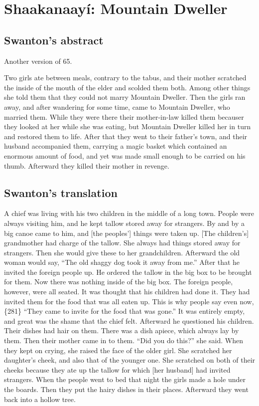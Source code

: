 
\resetexcnt
\chapter{Shaakanaayí: Mountain Dweller}\label{ch:92-mountain-dweller}

\section{Swanton’s abstract}\label{sec:92-swanton-abstract}

Another version of 65.

Two girls ate between meals, contrary to the tabus, and their mother scratched the inside of the mouth of the elder and scolded them both.
Among other things she told them that they could not marry Mountain Dweller.
Then the girls ran away, and after wandering for some time, came to Mountain Dweller, who married them.
While they were there their mother-in-law killed them becauser they looked at her while she was eating, but Mountain Dweller killed her in turn and restored them to life.
After that they went to their father’s town, and their husband accompanied them, carrying a magic basket which contained an enormous amount of food, and yet was made small enough to be carried on his thumb.
Afterward they killed their mother in revenge.

\section{Swanton’s translation}\label{sec:92-swanton-translation}

A chief was living with his two children in the middle of a long town.
People were always visiting him, and he kept tallow stored away for strangers.
By and by a big canoe came to him, and [the peoples’] things were taken up.
{}[The children’s] grandmother had charge of the tallow.
She always had things stored away for strangers.
Then she would give these to her grandchildren.
Afterward the old woman would say,
“The old shaggy dog took it away from me.”
After that he invited the foreign people up.
He ordered the tallow in the big box to be brought for them.
Now there was nothing inside of the big box.
The foreign people, however, were all seated.
It was thought that his children had done it.
They had invited them for the food that was all eaten up.
This is why people say even now,
\{281\} “They came to invite for the food that was gone.”
It was entirely empty, and great was the shame that the chief felt.
Afterward he questioned his children.
Their dishes had hair on them.
There was a dish apiece, which always lay by them.
Then their mother came in to them.
“Did you do this?”
she said.
When they kept on crying, she raised the face of the older girl.
She scratched her daughter’s cheek, and also that of the younger one.
She scratched on both of their cheeks because they ate up the tallow for which [her husband] had invited strangers.
When the people went to bed that night the girls made a hole under the boards.
Then they put the hairy dishes in their places.
Afterward they went back into a hollow tree.

